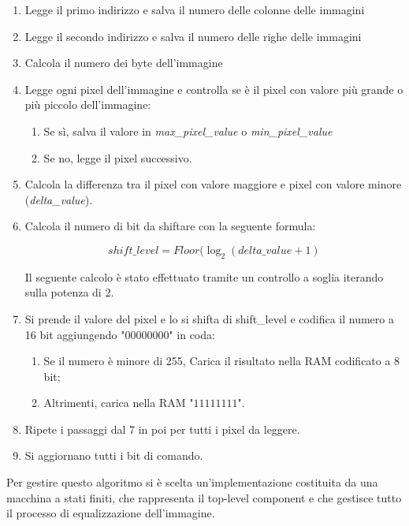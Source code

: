 \documentclass{article}
\begin{document}
\begin{enumerate}
\item Legge il primo indirizzo e salva il numero delle colonne delle immagini
\item Legge il secondo indirizzo e salva il numero delle righe delle immagini
\item Calcola il numero dei byte dell'immagine
\item Legge ogni pixel dell'immagine e controlla se è il pixel con valore più grande o più piccolo dell'immagine:
    \begin{enumerate}
        \item Se sì, salva il valore in \textit{max\_pixel\_value} o \textit{min\_pixel\_value}
        \item Se no, legge il pixel successivo.
    \end{enumerate}
\item Calcola la differenza tra il pixel con valore maggiore e pixel con valore minore (\textit{delta\_value}).
\item Calcola il numero di bit da shiftare con la seguente formula:

    \begin{equation}
        shift\_level = Floor(\log_2(delta\_value + 1)
    \end{equation}
    
    Il seguente calcolo è stato effettuato tramite un controllo a soglia iterando sulla potenza di 2.

\item Si prende il valore del pixel e lo si shifta di shift\_level e codifica il numero a 16 bit aggiungendo "$00000000$" in coda:
\begin{enumerate}
    \item Se il numero è minore di 255, Carica il risultato nella RAM codificato a 8 bit;
    \item Altrimenti, carica nella RAM "$11111111$".
\end{enumerate}


\item Ripete i passaggi dal 7 in poi per tutti i pixel da leggere.
\item Si aggiornano tutti i bit di comando.
\end{enumerate}

Per gestire questo algoritmo si è scelta un'implementazione costituita da una macchina a stati finiti, che rappresenta il top-level component
e che gestisce tutto il processo di equalizzazione dell'immagine.
\end{document}
